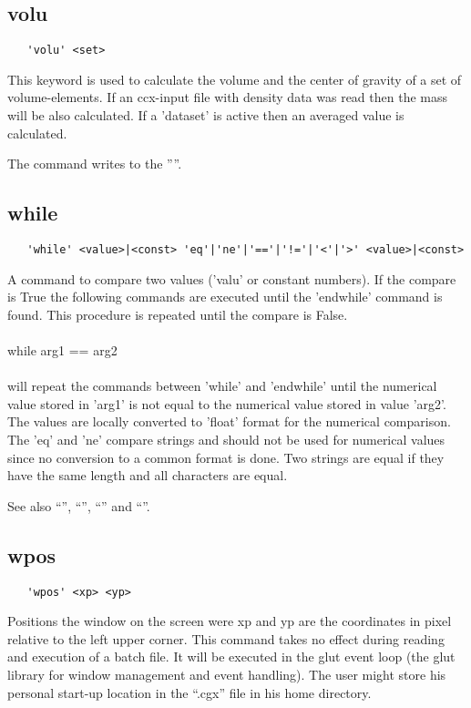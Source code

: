 \documentclass{article}
\begin{document}
\subsection{\label{volu}volu}
\begin{verbatim}
   'volu' <set>
\end{verbatim}
This keyword is used to calculate the volume and the center of gravity of a set of volume-elements. If an ccx-input file with density data was read then the mass will be also calculated. If a 'dataset' is active then an averaged value is calculated.

The command writes to the ''''.

\subsection{\label{while}while}
\begin{verbatim}
   'while' <value>|<const> 'eq'|'ne'|'=='|'!='|'<'|'>' <value>|<const>
\end{verbatim}
A command to compare two values ('valu' or constant numbers). If the compare is True the following commands are executed until the 'endwhile' command is found. This procedure is repeated until the compare is False.
\\\\while arg1 == arg2\\\\will repeat the commands between 'while' and 'endwhile' until the numerical value stored in 'arg1' is not equal to the numerical value stored in value 'arg2'. The values are locally converted to 'float' format for the numerical comparison. The 'eq' and 'ne' compare strings and should not be used for numerical values since no conversion to a common format is done. Two strings are equal if they have the same length and all characters are equal.

See also ``'', ``'', ``'' and ``''.

\subsection{\label{wpos}wpos}
\begin{verbatim}
   'wpos' <xp> <yp>
\end{verbatim}
Positions the window on the screen were xp and yp are the coordinates in pixel relative to the left upper corner. This command takes no effect during reading and execution of a batch file. It will be executed in the glut event loop (the glut library \cite{glut} for window management and event handling). The user might store his personal start-up location in the ``.cgx'' file in his home directory.
\end{document}
